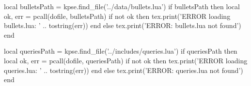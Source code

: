 \begin{luacode}
  local bulletsPath = kpse.find_file('../data/bullets.lua')
  if bulletsPath then
    local ok, err = pcall(dofile, bulletsPath)
    if not ok then tex.print('ERROR loading bullets.lua: ' .. tostring(err)) end
  else
    tex.print('ERROR: bullets.lua not found')
  end

  local queriesPath = kpse.find_file('../includes/queries.lua')
  if queriesPath then
    local ok, err = pcall(dofile, queriesPath)
    if not ok then tex.print('ERROR loading queries.lua: ' .. tostring(err)) end
  else
    tex.print('ERROR: queries.lua not found')
  end
\end{luacode}


\newcommand{\expblockQ}[2][]{%
  \jobtitle{\directlua{tex.print(experiences["#2"].title)}}%
  \dates{\directlua{tex.print(experiences["#2"].dateStart)}}{\directlua{tex.print(experiences["#2"].dateEnd)}}%
  \company{\directlua{tex.print(experiences["#2"].company)}} \location{\directlua{tex.print(experiences["#2"].location)}} \desc{\directlua{tex.print(experiences["#2"].desc)}}%
  \body{\directlua{tex.print(experiences["#2"].body)}}%
  \ifx&#1&\else\bullets{\directlua{renderBullets(getBulletsForCompany("#2"), "#1")}}\fi%
}

\newcommand{\exptrilonQ}[1][]{\expblockQ[#1]{trilon}}
\newcommand{\expinstapageQ}[1][]{\expblockQ[#1]{instapage}}
\newcommand{\expnerdwalletQ}[1][]{\expblockQ[#1]{nerdwallet}}
\newcommand{\expstubhubQ}[1][]{\expblockQ[#1]{stubhub}}
\newcommand{\expaenetworksQ}[1][]{\expblockQ[#1]{aenetworks}}
\newcommand{\expadweekQ}[1][]{\expblockQ[#1]{adweek}}
\newcommand{\expprometheusQ}[1][]{\expblockQ[#1]{prometheus}}
\newcommand{\expmediabistroQ}[1][]{\expblockQ[#1]{mediabistro}}

